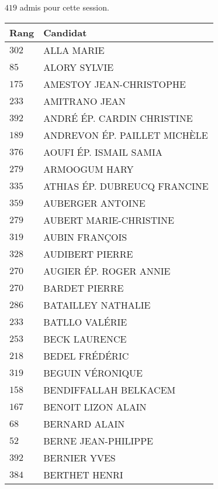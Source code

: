 




  $419$ admis pour cette session.

  \begin{xltabular}{\linewidth}{|l|X|}
    \hline
    \textbf{Rang} & \textbf{Candidat} \\
    \hline
    $302$ & ALLA MARIE \\
    \hline
    $85$ & ALORY SYLVIE \\
    \hline
    $175$ & AMESTOY JEAN-CHRISTOPHE \\
    \hline
    $233$ & AMITRANO JEAN \\
    \hline
    $392$ & ANDRÉ ÉP. CARDIN CHRISTINE \\
    \hline
    $189$ & ANDREVON ÉP. PAILLET MICHÈLE \\
    \hline
    $376$ & AOUFI ÉP. ISMAIL SAMIA \\
    \hline
    $279$ & ARMOOGUM HARY \\
    \hline
    $335$ & ATHIAS ÉP. DUBREUCQ FRANCINE \\
    \hline
    $359$ & AUBERGER ANTOINE \\
    \hline
    $279$ & AUBERT MARIE-CHRISTINE \\
    \hline
    $319$ & AUBIN FRANÇOIS \\
    \hline
    $328$ & AUDIBERT PIERRE \\
    \hline
    $270$ & AUGIER ÉP. ROGER ANNIE \\
    \hline
    $270$ & BARDET PIERRE \\
    \hline
    $286$ & BATAILLEY NATHALIE \\
    \hline
    $233$ & BATLLO VALÉRIE \\
    \hline
    $253$ & BECK LAURENCE \\
    \hline
    $218$ & BEDEL FRÉDÉRIC \\
    \hline
    $319$ & BEGUIN VÉRONIQUE \\
    \hline
    $158$ & BENDIFFALLAH BELKACEM \\
    \hline
    $167$ & BENOIT LIZON ALAIN \\
    \hline
    $68$ & BERNARD ALAIN \\
    \hline
    $52$ & BERNE JEAN-PHILIPPE \\
    \hline
    $392$ & BERNIER YVES \\
    \hline
    $384$ & BERTHET HENRI \\
    \hline

\end{xltabular}
